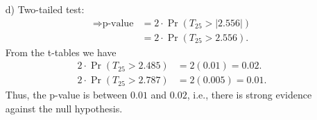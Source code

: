 \documentclass[12pt]{article}
\begin{document}
{\begin{minipage}[t]{0.98\textwidth}
\begin{minipage}[t]{0.47\textwidth}
\begin{enumerate}
\begin{align*}
&= \frac{1.4}{0.5477} = 2.556.
\end{align*}
The test statistic is outside of $\pm2.06$ $\Rightarrow$ we reject $H_0$ at the 5\% level.\\[0.3cm]
Conclusion: There is a difference in the average time and, in particular, the students of University B are quicker at completing the task.
\item[d)] Two-tailed test:
\begin{align*}
\Rightarrow \text{p-value} &= 2\cdot\Pr(T_{25} > |2.556|) \\&= 2\cdot\Pr(T_{25} > 2.556).
\end{align*}
From the t-tables we have
\begin{align*}
2\cdot\Pr(T_{25} > 2.485) &= 2(0.01) = 0.02. \\[0.2cm]
2\cdot\Pr(T_{25} > 2.787) &= 2(0.005) = 0.01.
\end{align*}
Thus, the p-value is between $0.01$ and $0.02$, i.e., there is strong evidence against the null hypothesis.
\end{enumerate}
\end{minipage}
\end{minipage}}\vspace{0.03\textwidth}
\end{document}
